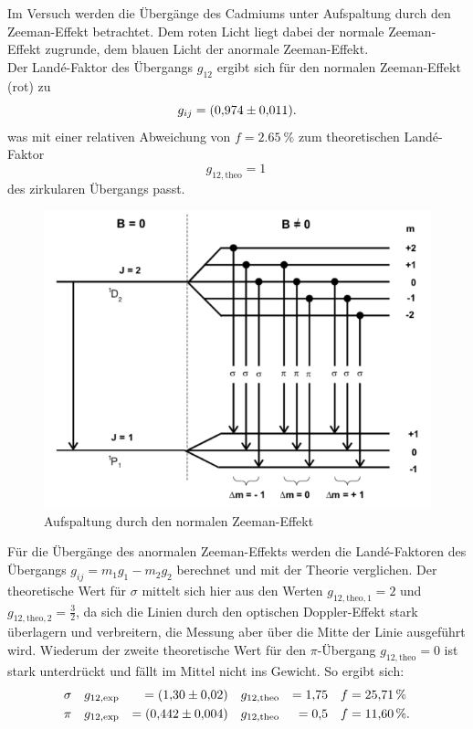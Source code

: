 Im Versuch werden die Übergänge des Cadmiums unter Aufspaltung durch den Zeeman-Effekt betrachtet.
Dem roten Licht liegt dabei der normale Zeeman-Effekt zugrunde, dem blauen Licht der anormale Zeeman-Effekt.\\
Der Landé-Faktor des Übergangs $g_{12}$ ergibt sich für den normalen Zeeman-Effekt (rot) zu
\begin{equation*}
  g_{ij}  = \SI{0.974 \pm 0.011}{}.
\end{equation*}
was mit einer relativen Abweichung von $f=\SI{2.65}{\%}$ zum theoretischen Landé-Faktor
\begin{equation*}
  g_{12, \text{theo}} = \SI{1}{}
\end{equation*}
des zirkularen Übergangs passt.
\begin{figure}[h!]
  \centering
  \includegraphics[width=\textwidth]{normal.png}
  \caption{Aufspaltung durch den normalen Zeeman-Effekt \cite{1}}
  \label{fig:normal}
\end{figure}
\FloatBarrier
Für die Übergänge des anormalen Zeeman-Effekts werden die Landé-Faktoren des Übergangs $g_{ij}=m_{1}g_{1}-m_{2}g_{2}$ berechnet und mit der Theorie verglichen.
Der theoretische Wert für $\sigma$ mittelt sich hier aus den Werten $g_{12, \text{theo}, 1}=2$ und $g_{12, \text{theo}, 2}=\frac{3}{2}$, da sich die Linien durch den optischen Doppler-Effekt stark überlagern und verbreitern, die Messung aber über die Mitte der Linie ausgeführt wird.
Wiederum der zweite theoretische Wert für den $\pi$-Übergang $g_{12, \text{theo}} = 0 $ ist stark unterdrückt und fällt im Mittel nicht ins Gewicht.
So ergibt sich:
\begin{align*}
  \sigma  &&& g_{12, \text{exp}} &= \SI{1.30 \pm 0.02}{}    &&&   g_{12, \text{theo}} &= \SI{1.75}{}     &&&  f=\SI{25.71}{\%}   \\
  \pi     &&& g_{12, \text{exp}} &= \SI{0.442 \pm 0.004}{}  &&&   g_{12, \text{theo}} &= \SI{0.5}{}   &&&  f=\SI{11.60}{\%}   .
\end{align*}
